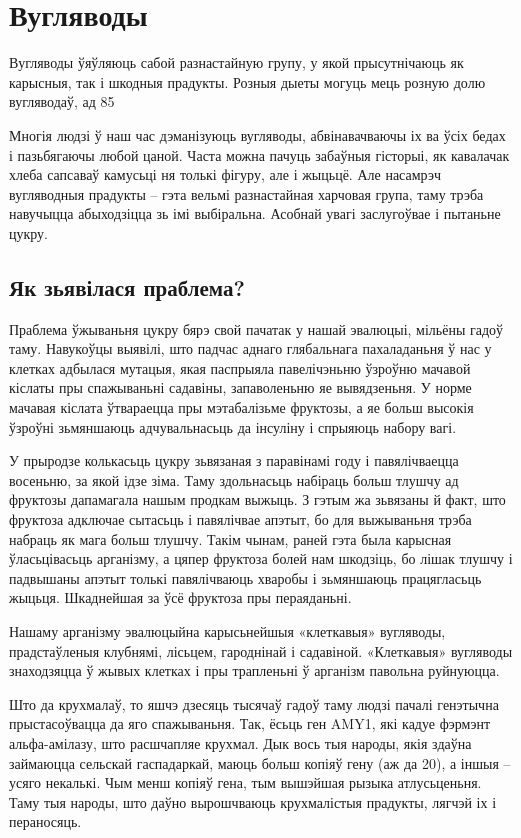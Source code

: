 \chapter{Вугляводы}

Вугляводы ўяўляюць сабой разнастайную групу, у якой прысутнічаюць як карысныя, так і шкодныя прадукты. Розныя дыеты могуць мець розную долю вугляводаў, ад 85%

Многія людзі ў наш час дэманізуюць вугляводы, абвінавачваючы іх ва ўсіх бедах і пазьбягаючы любой цаной. Часта можна пачуць забаўныя гісторыі, як кавалачак хлеба сапсаваў камусьці ня толькі фігуру, але і жыцьцё. Але насамрэч вугляводныя прадукты – гэта вельмі разнастайная харчовая група, таму трэба навучыцца абыходзіцца зь імі выбіральна. Асобнай увагі заслугоўвае і пытаньне цукру.

\section{Як зьявілася праблема?}

Праблема ўжываньня цукру бярэ свой пачатак у нашай эвалюцыі, мільёны гадоў таму. Навукоўцы выявілі, што падчас аднаго глябальнага пахаладаньня ў нас у клетках адбылася мутацыя, якая паспрыяла павелічэньню ўзроўню мачавой кіслаты пры спажываньні садавіны, запаволеньню яе вывядзеньня. У норме мачавая кіслата ўтвараецца пры мэтабалізьме фруктозы, а яе больш высокія ўзроўні зьмяншаюць адчувальнасьць да інсуліну і спрыяюць набору вагі.

У прыродзе колькасьць цукру зьвязаная з паравінамі году і павялічваецца восеньню, за якой ідзе зіма. Таму здольнасьць набіраць больш тлушчу ад фруктозы дапамагала нашым продкам выжыць. З гэтым жа зьвязаны й факт, што фруктоза адключае сытасьць і павялічвае апэтыт, бо для выжываньня трэба набраць як мага больш тлушчу. Такім чынам, раней гэта была карысная ўласьцівасьць арганізму, а цяпер фруктоза болей нам шкодзіць, бо лішак тлушчу і падвышаны апэтыт толькі павялічваюць хваробы і зьмяншаюць працягласьць жыцьця. Шкаднейшая за ўсё фруктоза пры пераяданьні.

Нашаму арганізму эвалюцыйна карысьнейшыя «клеткавыя» вугляводы, прадстаўленыя клубнямі, лісьцем, гароднінай і садавіной. «Клеткавыя» вугляводы знаходзяцца ў жывых клетках і пры трапленьні ў арганізм павольна руйнуюцца.

Што да крухмалаў, то яшчэ дзесяць тысячаў гадоў таму людзі пачалі генэтычна прыстасоўвацца да яго спажываньня. Так, ёсьць ген AMY1, які кадуе фэрмэнт альфа-амілазу, што расшчапляе крухмал. Дык вось тыя народы, якія здаўна займаюцца сельскай гаспадаркай, маюць больш копіяў гену (аж да 20), а іншыя – усяго некалькі. Чым менш копіяў гена, тым вышэйшая рызыка атлусьценьня. Таму тыя народы, што даўно вырошчваюць крухмалістыя прадукты, лягчэй іх і пераносяць.

